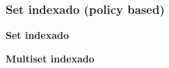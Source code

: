 \subsubsection{Set indexado (policy based)}
    \textbf{Set indexado}
    

    \textbf{Multiset indexado}
    